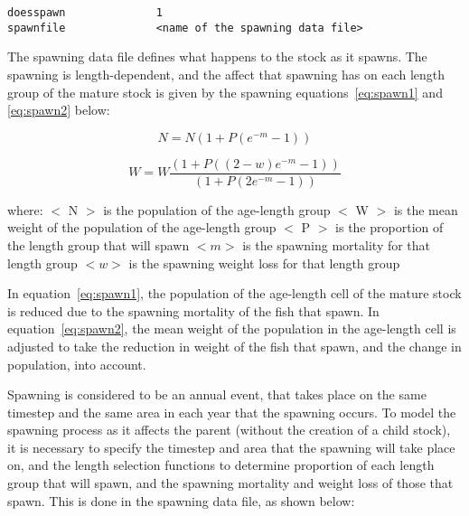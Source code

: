 \documentclass[10pt,twoside]{book}
\begin{document}
{\small\begin{verbatim}
doesspawn              1
spawnfile              <name of the spawning data file>
\end{verbatim}}

The spawning data file defines what happens to the stock as it spawns.  The spawning is length-dependent, and the affect that spawning has on each length group of the mature stock is given by the spawning equations~\ref{eq:spawn1} and \ref{eq:spawn2} below:

\newpage %
\begin{equation}\label{eq:spawn1}
N = N {\left(1 + P {(e^{-m} - 1)}\right)}
\end{equation}

\begin{equation}\label{eq:spawn2}
W = W \frac{\left(1 + P {((2 - w)e^{-m} - 1)}\right)}{\left(1 + P {(2e^{-m} - 1)}\right)}
\end{equation}

where:\newline
$<$ N $>$ is the population of the age-length group\newline
$<$ W $>$ is the mean weight of the population of the age-length group\newline
$<$ P $>$ is the proportion of the length group that will spawn\newline
$<m>$ is the spawning mortality for that length group\newline
$<w>$ is the spawning weight loss for that length group

\bigskip
In equation~\ref{eq:spawn1}, the population of the age-length cell of the mature stock is reduced due to the spawning mortality of the fish that spawn.  In equation~\ref{eq:spawn2}, the mean weight of the population in the age-length cell is adjusted to take the reduction in weight of the fish that spawn, and the change in population, into account.

\bigskip
Spawning is considered to be an annual event, that takes place on the same timestep and the same area in each year that the spawning occurs.  To model the spawning process as it affects the parent (without the creation of a child stock), it is necessary to specify the timestep and area that the spawning will take place on, and the length selection functions to determine proportion of each length group that will spawn, and the spawning mortality and weight loss of those that spawn.  This is done in the spawning data file, as shown below:
\end{document}

